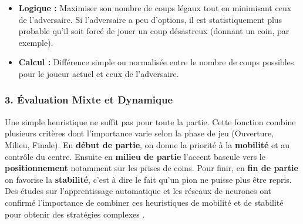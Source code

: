 \documentclass[a4paper]{article}
\begin{document}
\begin{itemize}
\begin{itemize}
    \item \textbf{Logique :} Maximiser son nombre de coups légaux tout en minimisant ceux de l'adversaire. Si l'adversaire a peu d'options, il est statistiquement plus probable qu'il soit forcé de jouer un coup désastreux (donnant un coin, par exemple).
    \item \textbf{Calcul :} Différence simple ou normalisée entre le nombre de coups possibles pour le joueur actuel et ceux de l'adversaire.
\end{itemize}

\subsubsection{3. Évaluation Mixte et Dynamique}
Une simple heuristique ne suffit pas pour toute la partie. Cette fonction combine plusieurs critères dont l'importance varie selon la phase de jeu (Ouverture, Milieu, Finale).
En \textbf{début de partie}, on donne la priorité à la \textbf{mobilité} et au contrôle du centre. Ensuite en \textbf{milieu de partie} l'accent bascule vers le \textbf{positionnement} notamment sur les prises de coins. Pour finir, en \textbf{fin de partie} on favorise la \textbf{stabilité}, c'est à dire le fait qu'un pion ne puisse plus être repris. Des études sur l'apprentissage automatique et les réseaux de neurones ont confirmé l'importance de combiner ces heuristiques de mobilité et de stabilité pour obtenir des stratégies complexes \cite{moriarty, cherry}.
\end{itemize}
\end{document}
